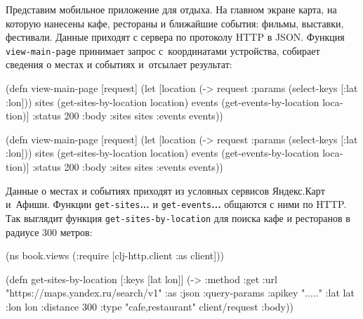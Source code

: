 \label{mobile-app-intro}


Представим мобильное приложение для отдыха. На главном экране карта, на которую
нанесены кафе, рестораны и ближайшие события: фильмы, выставки,
фестивали. Данные приходят с сервера по протоколу HTTP в JSON. Функция
\verb|view-main-page| принимает запрос с~координатами устройства, собирает
сведения о местах и событиях и~отсылает результат:

\ifx\devicetype\mobile

\begin{english}
  \begin{clojure}
(defn view-main-page [request]
  (let [location
        (-> request
            :params
            (select-keys [:lat :lon]))
        sites
        (get-sites-by-location location)
        events
        (get-events-by-location
          location)]
    {:status 200
     :body {:sites sites
            :events events}}))
  \end{clojure}
\end{english}

\else

\begin{english}
  \begin{clojure}
(defn view-main-page [request]
  (let [location (-> request :params (select-keys [:lat :lon]))
        sites (get-sites-by-location location)
        events (get-events-by-location location)]
    {:status 200
     :body {:sites sites :events events}}))
  \end{clojure}
\end{english}

\fi

Данные о местах и событиях приходят из условных сервисов Яндекс.Карт
и~Афиши. Функции \verb|get-sites|\textbf{...} и \verb|get-events|\textbf{...}
общаются с ними по HTTP. Так выглядит функция \verb|get-sites-by-location| для
поиска кафе и ресторанов в радиусе 300 метров:


\ifx\devicetype\mobile

\begin{english}
  \begin{clojure}
(ns book.views
  (:require
   [clj-http.client :as client]))

(defn get-sites-by-location
  [{:keys [lat lon]}]
  (-> {:method :get
       :url
       "https://maps.yandex.ru/search/v1"
       :as :json
       :query-params
       {:apikey "....."
        :lat lat :lon lon :distance 300
        :type "cafe,restaurant"}}
      client/request
      :body))
  \end{clojure}
\end{english}

